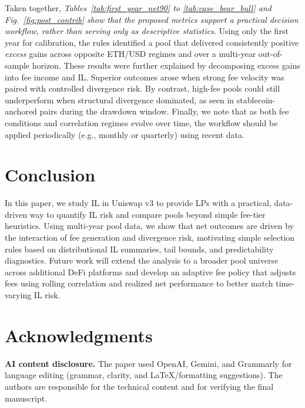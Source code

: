 \documentclass[journal]{IEEEtran}
\begin{document}
Taken together, \noindent\textit{Tables~\ref{tab:first_year_net90} to \ref{tab:case_bear_bull} and Fig.~\ref{fig:post_contrib} show that the proposed metrics support a practical decision workflow, rather than serving only as descriptive statistics}. 
Using only the first year for calibration, the rules identified a pool that delivered consistently positive \emph{excess} gains across opposite ETH/USD regimes and over a multi-year out-of-sample horizon. 
These results were further explained by decomposing excess gains into fee income and IL. 
Superior outcomes arose when strong fee velocity was paired with controlled divergence risk. 
By contrast, high-fee pools could still underperform when structural divergence dominated, as seen in stablecoin-anchored pairs during the drawdown window. 
Finally, we note that as both fee conditions and correlation regimes evolve over time, the workflow should be applied periodically (e.g., monthly or quarterly) using recent data.



\section{Conclusion}
\label{sec:conclusion}
In this paper, we study IL in Uniswap v3 to provide LPs with a practical, data-driven way to quantify IL risk and compare pools beyond simple fee-tier heuristics. 
Using multi-year pool data, we show that net outcomes are driven by the interaction of fee generation and divergence risk, motivating simple selection rules based on distributional IL summaries, tail bounds, and predictability diagnostics. 
Future work will extend the analysis to a broader pool universe across additional DeFi platforms and develop an adaptive fee policy that adjusts fees using rolling correlation and realized net performance to better match time-varying IL risk.

\section*{Acknowledgments}
\noindent\textbf{AI content disclosure.} The paper used OpenAI, Gemini, and Grammarly for language editing (grammar, clarity, and \LaTeX{}/formatting suggestions). The authors are responsible for the technical content and for verifying the final manuscript.




\end{document}
